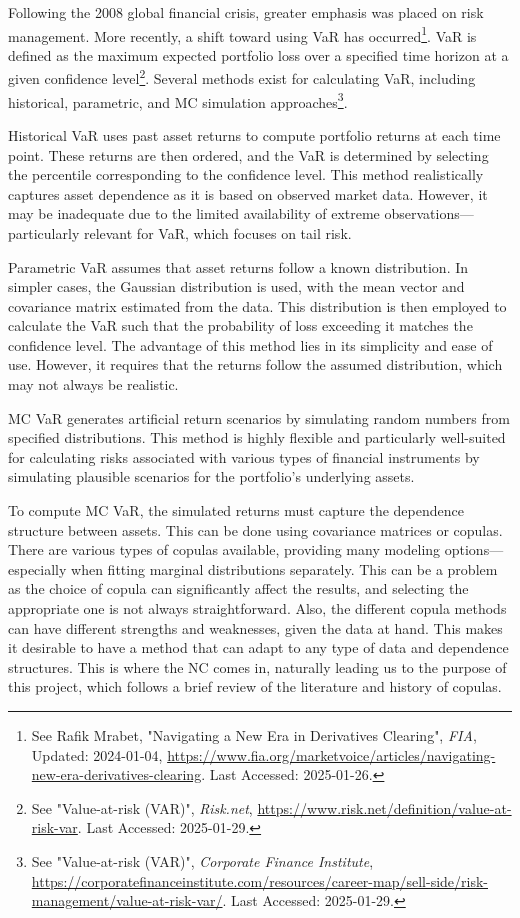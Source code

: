 Following the 2008 global financial crisis, greater emphasis was placed on risk management. More recently, a shift toward using \gls{VaR} has occurred\footnote{See Rafik Mrabet, "Navigating a New Era in Derivatives Clearing", \textit{FIA}, Updated: 2024-01-04, \url{https://www.fia.org/marketvoice/articles/navigating-new-era-derivatives-clearing}. Last Accessed: 2025-01-26.}. \gls{VaR} is defined as the maximum expected portfolio loss over a specified time horizon at a given confidence level\footnote{See "Value-at-risk (VAR)", \textit{Risk.net}, \url{https://www.risk.net/definition/value-at-risk-var}. Last Accessed: 2025-01-29.}. Several methods exist for calculating \gls{VaR}, including historical, parametric, and \gls{MC} simulation approaches\footnote{See "Value-at-risk (VAR)", \textit{Corporate Finance Institute}, \url{https://corporatefinanceinstitute.com/resources/career-map/sell-side/risk-management/value-at-risk-var/}. Last Accessed: 2025-01-29.}.  

Historical \gls{VaR} uses past asset returns to compute portfolio returns at each time point. These returns are then ordered, and the \gls{VaR} is determined by selecting the percentile corresponding to the confidence level. This method realistically captures asset dependence as it is based on observed market data\footnotemark[\value{footnote}]. However, it may be inadequate due to the limited availability of extreme observations—particularly relevant for \gls{VaR}, which focuses on tail risk.

Parametric \gls{VaR} assumes that asset returns follow a known distribution. In simpler cases, the Gaussian distribution is used, with the mean vector and covariance matrix estimated from the data. This distribution is then employed to calculate the \gls{VaR} such that the probability of loss exceeding it matches the confidence level\footnotemark[\value{footnote}]. The advantage of this method lies in its simplicity and ease of use. However, it requires that the returns follow the assumed distribution, which may not always be realistic.

\gls{MC} \gls{VaR} generates artificial return scenarios by simulating random numbers from specified distributions\footnotemark[\value{footnote}]. This method is highly flexible and particularly well-suited for calculating risks associated with various types of financial instruments by simulating plausible scenarios for the portfolio’s underlying assets.

To compute \gls{MC} \gls{VaR}, the simulated returns must capture the dependence structure between assets. This can be done using covariance matrices or copulas. There are various types of copulas available, providing many modeling options—especially when fitting marginal distributions separately. This can be a problem as the choice of copula can significantly affect the results, and selecting the appropriate one is not always straightforward. Also, the different copula methods can have different strengths and weaknesses, given the data at hand. This makes it desirable to have a method that can adapt to any type of data and dependence structures. This is where the \gls{NC} comes in, naturally leading us to the purpose of this project, which follows a brief review of the literature and history of copulas.

